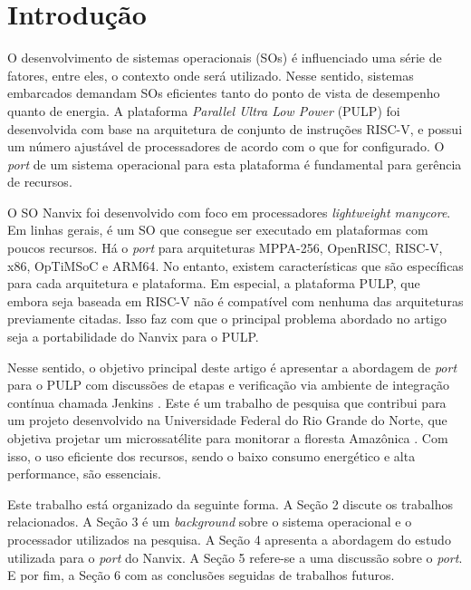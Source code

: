 \section{Introdução}

O desenvolvimento de sistemas operacionais (SOs) é influenciado uma série de fatores, entre eles, o contexto onde será utilizado. Nesse sentido, sistemas
embarcados demandam SOs eficientes tanto do ponto de vista de desempenho quanto de energia. A plataforma \textit{Parallel Ultra Low Power} (PULP) \cite{PULP-Plataform} foi desenvolvida com base na arquitetura de conjunto de instruções RISC-V, e possui um número ajustável de processadores de acordo com o que for configurado. O \textit{port} de um sistema operacional para esta plataforma é fundamental para gerência de recursos.

O SO Nanvix foi desenvolvido com foco em processadores \textit{lightweight manycore}. Em linhas gerais, é um SO que consegue ser executado em plataformas com poucos
recursos. Há o \textit{port} para arquiteturas MPPA-256, OpenRISC, RISC-V, x86, OpTiMSoC e ARM64. No entanto, existem características que são específicas para cada 
arquitetura e plataforma. Em especial, a plataforma PULP, que embora seja baseada em RISC-V não é compatível com nenhuma das arquiteturas previamente citadas. 
Isso faz com que o principal problema abordado no artigo seja a portabilidade do Nanvix para o PULP.

Nesse sentido, o objetivo principal deste artigo é apresentar a abordagem de \textit{port} para o PULP com discussões de etapas e verificação via ambiente de integração contínua chamada Jenkins \cite{JenkinsServer}. Este é um trabalho de pesquisa que contribui para um projeto desenvolvido na Universidade Federal do Rio Grande do Norte, que objetiva projetar  um microssatélite para monitorar a floresta Amazônica \cite{RepoCervero}. Com isso, o uso eficiente dos recursos, sendo o baixo consumo energético e alta performance, são essenciais.

Este trabalho está organizado da seguinte forma. A Seção 2 discute os trabalhos relacionados. A Seção 3 é um \textit{background} sobre o sistema operacional e o 
processador utilizados na pesquisa. A Seção 4 apresenta a abordagem do estudo utilizada para o \textit{port} do Nanvix. A Seção 5 refere-se a uma discussão sobre 
o \textit{port}. E por fim, a Seção 6 com as conclusões seguidas de trabalhos futuros.

